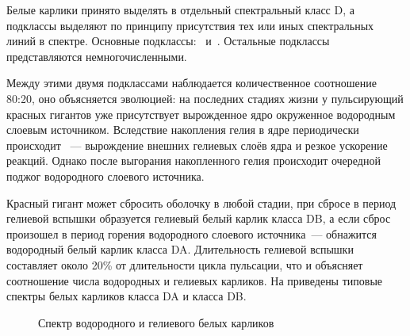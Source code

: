 Белые карлики принято выделять в отдельный спектральный класс D, а подклассы выделяют по принципу присутствия тех или иных спектральных линий в спектре. Основные подклассы:~ и~. Остальные подклассы представляются немногочисленными. 

Между этими двумя подклассами наблюдается количественное соотношение 80:20, оно объясняется эволюцией: на последних стадиях жизни у пульсирующий красных гигантов уже присутствует вырожденное ядро окруженное водородным слоевым источником. Вследствие накопления гелия в ядре периодически происходит ~--- вырождение внешних гелиевых слоёв ядра и резкое ускорение реакций. Однако после выгорания накопленного гелия происходит очередной поджог водородного слоевого источника. 

Красный гигант может сбросить оболочку в любой стадии, при сбросе в период гелиевой вспышки образуется гелиевый белый карлик класса DB, а если сброс произошел в период горения водородного слоевого источника~--- обнажится водородный белый карлик класса DA. Длительность гелиевой вспышки составляет около 20\% от длительности цикла пульсации, что и объясняет соотношение числа водородных и гелиевых карликов. На  приведены типовые спектры белых карликов класса DA и класса DB.


\begin{figure}[h!]
    \centering
    \caption{Спектр водородного и гелиевого белых карликов}
    \label{pic:spectrum-wd}
\end{figure}

